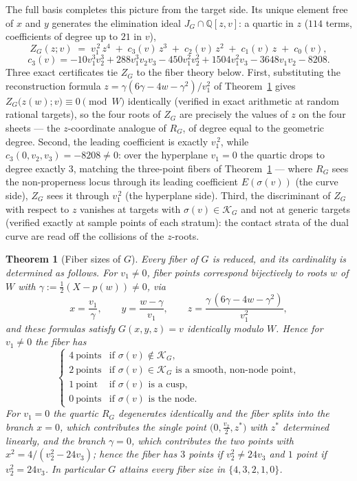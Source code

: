 \documentclass[11pt]{article}
\theoremstyle{plain}
\newtheorem{theorem}{Theorem}[section]
\theoremstyle{definition}
\theoremstyle{remark}
\newcommand{\Q}{\mathbb{Q}}
\begin{document}
The full basis completes this picture from the target side. Its unique
element free of $x$ and $y$ generates the elimination ideal
$J_G\cap\Q[z,v]$: a quartic in $z$ ($114$ terms, coefficients of degree up to
$21$ in $v$),
\[
Z_G(z;v)\;=\;v_1^{\,2}\,z^4\;+\;c_3(v)\,z^3\;+\;c_2(v)\,z^2
\;+\;c_1(v)\,z\;+\;c_0(v),
\]
\[
c_3(v)=-10v_1^3v_2^3+288v_1^3v_2v_3-450v_1^2v_2^2+1504v_1^2v_3
-3648v_1v_2-8208 .
\]
Three exact certificates tie $Z_G$ to the fiber theory below. First,
substituting the reconstruction formula $z=\gamma(6\gamma-4w-\gamma^2)/v_1^2$
of Theorem~\ref{thm:fibG} gives $Z_G\bigl(z(w);v\bigr)\equiv0 \pmod W$
identically (verified in exact arithmetic at random rational targets), so the
four roots of $Z_G$ are precisely the values of $z$ on the four sheets ---
the $z$-coordinate analogue of $R_G$, of degree equal to the geometric
degree. Second, the leading coefficient is exactly $v_1^{\,2}$, while
$c_3(0,v_2,v_3)=-8208\neq0$: over the hyperplane $v_1=0$ the quartic drops to
degree exactly $3$, matching the three-point fibers of
Theorem~\ref{thm:fibG} --- where $R_G$ sees the non-properness locus through
its leading coefficient $E(\sigma(v))$ (the curve side), $Z_G$ sees it
through $v_1^{\,2}$ (the hyperplane side). Third, the discriminant of $Z_G$
with respect to $z$ vanishes at targets with $\sigma(v)\in\mathcal K_G$ and
not at generic targets (verified exactly at sample points of each stratum):
the contact strata of the dual curve are read off the collisions of the
$z$-roots.

\begin{theorem}[Fiber sizes of $G$]\label{thm:fibG}
Every fiber of $G$ is reduced, and its cardinality is determined as follows.
For $v_1\ne0$, fiber points correspond bijectively to roots $w$ of $W$ with
$\gamma:=\tfrac12(X-p(w))\ne0$, via
\[
x=\frac{v_1}{\gamma},\qquad y=\frac{w-\gamma}{v_1},\qquad
z=\frac{\gamma\,(6\gamma-4w-\gamma^2)}{v_1^2},
\]
and these formulas satisfy $G(x,y,z)=v$ identically modulo $W$. Hence for
$v_1\neq0$ the fiber has
\[
\begin{cases}
4\ \text{points} & \text{if }\sigma(v)\notin\mathcal{K}_G,\\
2\ \text{points} & \text{if }\sigma(v)\in\mathcal K_G\text{ is a smooth, non-node point},\\
1\ \text{point} & \text{if }\sigma(v)\text{ is a cusp},\\
0\ \text{points} & \text{if }\sigma(v)\text{ is the node}.
\end{cases}
\]
For $v_1=0$ the quartic $R_G$ degenerates identically and the fiber splits into
the branch $x=0$, which contributes the single point
$\bigl(0,\tfrac{v_2}2,z^*\bigr)$ with $z^*$ determined linearly, and the branch
$\gamma=0$, which contributes the two points with $x^2=4/(v_2^2-24v_3)$; hence
the fiber has $3$ points if $v_2^2\ne24v_3$ and $1$ point if $v_2^2=24v_3$. In
particular $G$ attains every fiber size in $\{4,3,2,1,0\}$.
\end{theorem}
\end{document}

